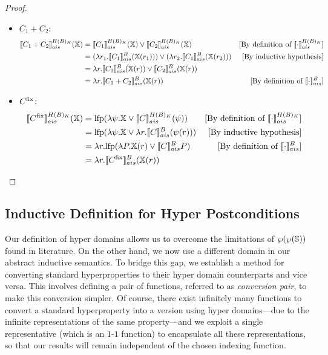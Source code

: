 \documentclass[
  10pt,       %
  twoside,    %
  a4paper,    %
  english,    %
  tikz,       %
  openright,  %
]{book}
\begin{document}
\begin{proof}
\begin{itemize}
    \item $C_1 + C_2$:
      \begin{align*}
        \asem[H(B)_K]{C_1 + C_2}(\chi)
          &= \asem[H(B)_K]{C_1}(\chi) \lor \asem[H(B)_K]{C_2}(\chi)
          &\text{[By definition of $\asem[H(B)_K]{\cdot}$]} \\
          &= (\lambda r_1 . \asem[B]{C_1}(\chi(r_1))) \lor (\lambda r_2 . \asem[B]{C_1}(\chi(r_2)))
          &\text{[By inductive hypothesis]} \\
          &= \lambda r . \asem[B]{C_1}(\chi(r)) \lor \asem[B]{C_2}(\chi(r)) \\
          &= \lambda r . \asem[B]{C_1 + C_2}(\chi(r))
          &\text{[By definition of $\asem[B]{\cdot}$]} \\
      \end{align*}

    \item $C^\fix$:
      \begin{align*}
        \asem[H(B)_K]{C^\fix}(\chi)
          &= \lfp(\lambda \psi . \chi \lor \asem[H(B)_K]{C}(\psi))
          &\text{[By definition of $\asem[H(B)_K]{\cdot}$]} \\
          &= \lfp(\lambda \psi . \chi \lor \lambda r . \asem[B]{C}(\psi(r)))
          &\text{[By inductive hypothesis]} \\
          &= \lambda r . \lfp(\lambda P . \chi(r) \lor \asem[B]{C} P)
          &\text{[By definition of $\asem[B]{\cdot}$]} \\
          &= \lambda r . \asem[B]{C^\fix}(\chi(r))
      \end{align*}
  \end{itemize}
\end{proof}


\subsection{Inductive Definition for Hyper Postconditions}

Our definition of hyper domains allows us to overcome the limitations of
$\pow{\pow{\states}}$ found in literature. On the other hand, we 
now use a different domain in our abstract inductive
semantics. To bridge this gap, we establish a method for converting standard
hyperproperties to their hyper domain counterparts and vice versa. This
involves defining a pair of functions, referred to as \emph{conversion pair},
to make this conversion simpler. Of course, there exist infinitely many functions
to convert a standard hyperproperty into a version using hyper domains---due to
the infinite representations of the same property---and we exploit a single
representative (which is an $1$-$1$ function) to encapsulate all these representations, 
so that
our results will remain independent of the chosen indexing function.
\end{document}
